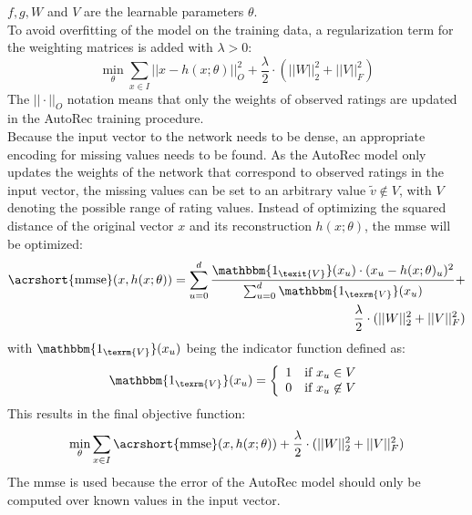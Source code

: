 $f, g, W$ and $V$ are the learnable parameters $\theta$.\\
To avoid overfitting of the model on the training data, a regularization term for the weighting matrices is added with $\lambda > 0$:\\
\begin{equation}
   \min_{\theta}\sum_{x \in I} ||x - h(x; \theta)||^{2}_{O} + \frac{\lambda}{2} \cdot (||W||^{2}_{2} + ||V||^{2}_{F})
\end{equation}
The $||\cdot||_{O}$ notation means that only the weights of observed ratings are updated in the AutoRec training procedure.\\
Because the input vector to the network needs to be dense, an appropriate encoding for missing values needs to be found. As the AutoRec model only updates the weights of the network that correspond to observed ratings in the input vector, the missing values can be set to an arbitrary value $\tilde{v} \not\in V$, with $V$ denoting the possible range of rating values. Instead of optimizing the squared distance of the original vector $x$ and its reconstruction $h(x; \theta)$, the \acrfull{mmse} will be optimized:\\
\begin{equation}
\begin{align*}
    \text{\acrshort{mmse}}(x, h(x;\theta)) = \sum_{u=0}^{d}\frac{\mathbbm{1_{\texit{V}}}(x_u) \cdot (x_u - h(x;\theta)_u)^{2}}
    {\sum_{u=0}^{d} \mathbbm{1_{\texrm{V}}}(x_u)} + \\ \frac{\lambda}{2} \cdot (||W||^{2}_{2} + ||V||^{2}_{F}) 
\end{align*}
\end{equation}
with $\mathbbm{1_{\texrm{V}}}(x_u)$ being the indicator function defined as:\\
\begin{equation}
    \mathbbm{1_{\texrm{V}}}(x_u) = \left\{
	\begin{array}{ll}
		1  & \mbox{if } x_u \in V\\
		0 & \mbox{if } x_u \not\in V \\
	\end{array}
\right.
\end{equation}
This results in the final objective function:\\
\begin{equation}
    \min_{\theta}\sum_{x \in I} \text{\acrshort{mmse}}(x, h(x;\theta)) + \frac{\lambda}{2} \cdot (||W||^{2}_{2} + ||V||^{2}_{F})
\end{equation}
The \acrshort{mmse} is used because the error of the AutoRec model should only be computed over known values in the input vector.\\
